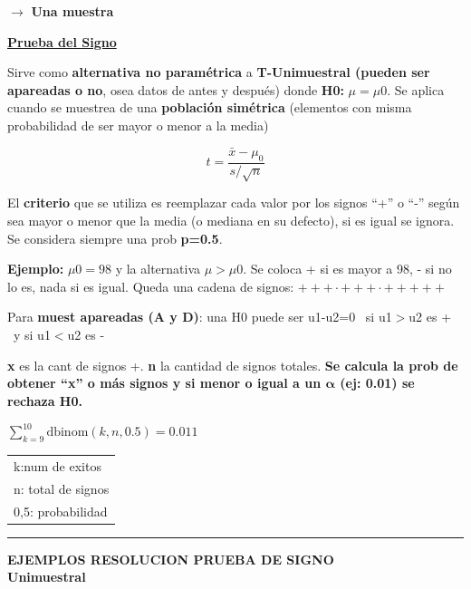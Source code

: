 \documentclass[10pt,a4paper]{article}
\begin{document}
\hfill $\longrightarrow$ \textbf{Una muestra}

{\large\bfseries\uline{Prueba del Signo}\par}
\vspace{2pt}

\begin{minipage}{0.63\textwidth}
Sirve como \textbf{alternativa no paramétrica} a \textbf{T-Unimuestral (pueden ser apareadas o no}, osea datos de antes y después) donde \textbf{H0:} $\mu = \mu 0$. Se aplica cuando se muestrea de una \textbf{población simétrica} (elementos con misma probabilidad de ser mayor o menor a la media)
\end{minipage}\hfill
\begin{minipage}{0.30\textwidth}
\[
t = \frac{\bar{x}-\mu_0}{s/\sqrt{n}}
\]
\end{minipage}

El \textbf{criterio} que se utiliza es reemplazar cada valor por los signos ``+'' o ``-'' según sea mayor o menor que la media (o mediana en su defecto), si es igual se ignora. Se considera siempre una prob \textbf{p=0.5}.

\textbf{Ejemplo:} $\mu 0 = 98$ y la alternativa $\mu > \mu 0$. Se coloca + si es mayor a 98, - si no lo es, nada si es igual. Queda una cadena de signos: $+++\cdot+++\cdot+++++$

Para \textbf{muest apareadas (A y D)}: una H0 puede ser u1-u2=0 \ si u1$>$u2 es + \ y si u1$<$u2 es -

\textbf{x} es la cant de signos +. \textbf{n} la cantidad de signos totales. \textbf{Se calcula la prob de obtener ``x'' o más signos y si menor o igual a un $\boldsymbol{\alpha}$ (ej: 0.01) se rechaza H0.}

\begin{center}
\vspace{-4pt}
\colorbox{yellow!60}{$\displaystyle \sum_{k=9}^{10} \text{dbinom}(k,n,0.5) = 0.011$}
\quad
{\small
\begin{tabular}{@{}l@{}}
k:num de exitos \\
n: total de signos \\
0,5: probabilidad
\end{tabular}
}
\vspace{-6pt}
\end{center}

\hrule
\vspace{2pt}

\begin{center}
{\large\bfseries EJEMPLOS RESOLUCION PRUEBA DE SIGNO} \\ \textbf{Unimuestral}
\end{center}
\vspace{-4pt}
\end{document}
